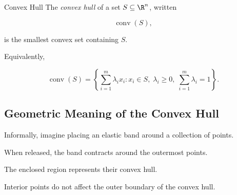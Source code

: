 \begin{definitionbox}{Convex Hull}
The \emph{convex hull} of a set \(S\subseteq\R^n\), written

\[
\boxed{
\operatorname{conv}(S),
}
\]

is the smallest convex set containing \(S\).
\end{definitionbox}

Equivalently,

\[
\boxed{
\operatorname{conv}(S)
=
\left\{
\sum_{i=1}^{m}\lambda_ix_i:
x_i\in S,\;
\lambda_i\geq0,\;
\sum_{i=1}^{m}\lambda_i=1
\right\}.
}
\]

\subsection{Geometric Meaning of the Convex Hull}
\label{subsec:convex-hull-geometric-meaning}

Informally, imagine placing an elastic band around a collection of points.

When released, the band contracts around the outermost points.

The enclosed region represents their convex hull.

\begin{centereddiagram}
\end{centereddiagram}

Interior points do not affect the outer boundary of the convex hull.

